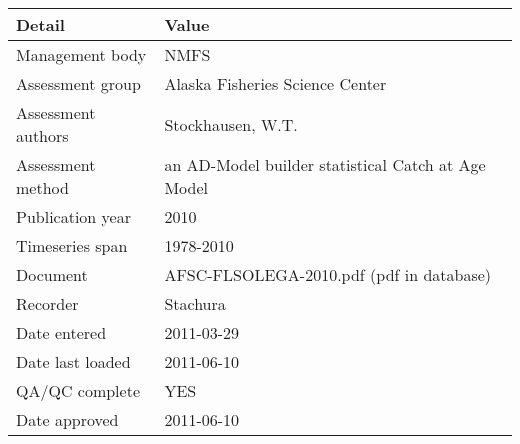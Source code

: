 \begin{table}[htb]
\centering
\begin{tabular}{lp{7cm}}
\toprule
Detail & Value \\
\midrule
Management body    & NMFS                                               \\
Assessment group   & Alaska Fisheries Science Center                    \\
Assessment authors & Stockhausen, W.T.                                  \\
Assessment method  & an AD-Model builder statistical Catch at Age Model \\
Publication year   & 2010                                               \\
Timeseries span    & 1978-2010                                          \\
Document           & AFSC-FLSOLEGA-2010.pdf (pdf in database)           \\
Recorder           & Stachura                                           \\
Date entered       & 2011-03-29                                         \\
Date last loaded   & 2011-06-10                                         \\
QA/QC complete     & YES                                                \\
Date approved      & 2011-06-10                                         \\
\bottomrule
\end{tabular}
\label{tab:assessdet}
\end{table}
